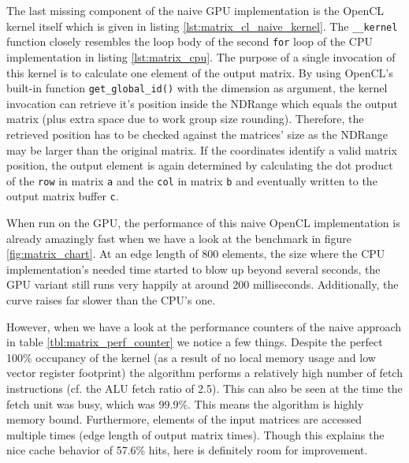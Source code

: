 

The last missing component of the naive GPU implementation is the OpenCL kernel itself which is given in listing \ref{lst:matrix_cl_naive_kernel}. The \lstinline!__kernel! function closely resembles the loop body of the second \lstinline!for! loop of the CPU implementation in listing \ref{lst:matrix_cpu}. The purpose of a single invocation of this kernel is to calculate one element of the output matrix. By using OpenCL's built-in function \lstinline!get_global_id()! with the dimension as argument, the kernel invocation can retrieve it's position inside the NDRange which equals the output matrix (plus extra space due to work group size rounding). Therefore, the retrieved position has to be checked against the matrices' size as the NDRange may be larger than the original matrix. If the coordinates identify a valid matrix position, the output element is again determined by calculating the dot product of the \lstinline!row! in matrix \lstinline!a! and the \lstinline!col! in matrix \lstinline!b! and eventually written to the output matrix buffer \lstinline!c!.



When run on the GPU, the performance of this naive OpenCL implementation is already amazingly fast when we have a look at the benchmark in figure \ref{fig:matrix_chart}. At an edge length of 800 elements, the size where the CPU implementation's needed time started to blow up beyond several seconds, the GPU variant still runs very happily at around 200 milliseconds. Additionally, the curve raises far slower than the CPU's one.

However, when we have a look at the performance counters of the naive approach in table \ref{tbl:matrix_perf_counter} we notice a few things. Despite the perfect 100\% occupancy of the kernel (as a result of no local memory usage and low vector register footprint) the algorithm performs a relatively high number of fetch instructions (cf. the ALU fetch ratio of 2.5). This can also be seen at the time the fetch unit was busy, which was 99.9\%. This means the algorithm is highly memory bound. Furthermore, elements of the input matrices are accessed multiple times (edge length of output matrix times). Though this explains the nice cache behavior of 57.6\% hits, here is definitely room for improvement.


